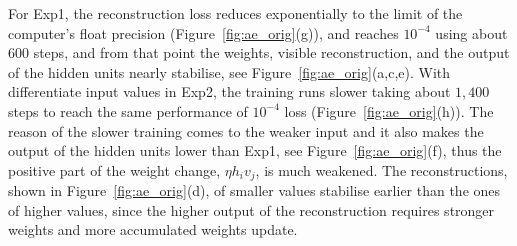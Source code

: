 For Exp1, the reconstruction loss reduces exponentially to the limit of the computer's float precision (Figure~\ref{fig:ae_orig}(g)), and reaches $10^{-4}$ using about 600 steps, and from that point the weights, visible reconstruction, and the output of the hidden units nearly stabilise, see Figure~\ref{fig:ae_orig}(a,c,e).
With differentiate input values in Exp2, the training runs slower taking about $1,400$ steps to reach the same performance of $10^{-4}$ loss (Figure~\ref{fig:ae_orig}(h)).
The reason of the slower training comes to the weaker input and it also makes the output of the hidden units lower than Exp1, see Figure~\ref{fig:ae_orig}(f), thus the positive part of the weight change, $\eta h_i v_j$, is much weakened. 
The reconstructions, shown in Figure~\ref{fig:ae_orig}(d), of smaller values stabilise earlier than the ones of higher values, since the higher output of the reconstruction requires stronger weights and more accumulated weights update. 
